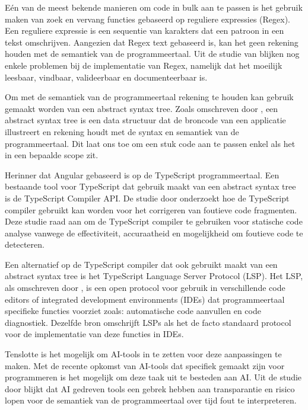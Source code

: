 Eén van de meest bekende manieren om code in bulk aan te passen is het gebruik maken van zoek en vervang functies gebaseerd op reguliere expressies (Regex).
Een reguliere expressie is een sequentie van karakters dat een patroon in een tekst omschrijven.
Aangezien dat Regex text gebaseerd is, kan het geen rekening houden met de semantiek van de programmeertaal.
Uit de studie van \textcite{Michael2019} blijken nog enkele problemen bij de implementatie van Regex, namelijk dat het moeilijk leesbaar, vindbaar, valideerbaar en documenteerbaar is.

Om met de semantiek van de programmeertaal rekening te houden kan gebruik gemaakt worden van een abstract syntax tree.
Zoals omschreven door \textcite{Sun2023}, een abstract syntax tree is een data structuur dat de broncode van een applicatie illustreert en rekening houdt met de syntax en semantiek van de programmeertaal.
Dit laat ons toe om een stuk code aan te passen enkel als het in een bepaalde scope zit.

Herinner dat Angular gebaseerd is op de TypeScript programmeertaal.
Een bestaande tool voor TypeScript dat gebruik maakt van een abstract syntax tree is de TypeScript Compiler API.
De studie door \textcite{Reid2023} onderzoekt hoe de TypeScript compiler gebruikt kan worden voor het corrigeren van foutieve code fragmenten. 
Deze studie raad aan om de TypeScript compiler te gebruiken voor statische code analyse vanwege de effectiviteit, accuraatheid en mogelijkheid om foutieve code te detecteren.

Een alternatief op de TypeScript compiler dat ook gebruikt maakt van een abstract syntax tree is het TypeScript Language Server Protocol (LSP).
Het LSP, als omschreven door \textcite{Bork2023}, is een open protocol voor gebruik in verschillende code editors of integrated development environments (IDEs) dat programmeertaal specifieke functies voorziet zoals: automatische code aanvullen en code diagnostiek. 
Dezelfde bron omschrijft LSPs als het de facto standaard protocol voor de implementatie van deze functies in IDEs.

Tenslotte is het mogelijk om AI-tools in te zetten voor deze aanpassingen te maken.
Met de recente opkomst van AI-tools dat specifiek gemaakt zijn voor programmeren is het mogelijk om deze taak uit te besteden aan AI.
Uit de studie door \textcite{Hodovychenko2025} blijkt dat AI gedreven tools een gebrek hebben aan transparantie en risico lopen voor de semantiek van de programmeertaal over tijd fout te interpreteren.

